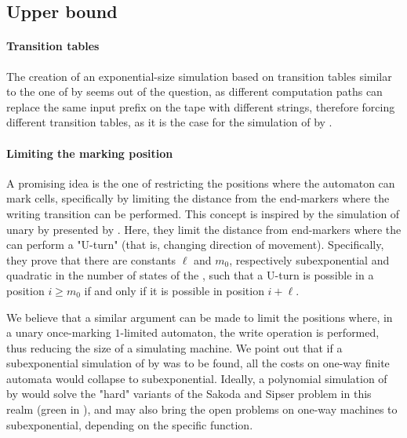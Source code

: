 \subsection{Upper bound}

\paragraph{Transition tables} The creation of an exponential-size simulation based on transition tables similar to the one of \TNFA by \ODFA seems out of the question, as different computation paths can replace the same input prefix on the tape with different strings, therefore forcing different transition tables, as it is the case for the simulation of \OLA by \ODFA.

\paragraph{Limiting the marking position} A promising idea is the one of restricting the positions where the automaton can mark cells, specifically by limiting the distance from the end-markers where the writing transition can be performed.
This concept is inspired by the simulation of unary \TNFA by \ODFA presented by .
Here, they limit the distance from end-markers where the \TNFA can perform a "U-turn" (that is, changing direction of movement).
Specifically, they prove that there are constants $\ell$ and $m_0$, respectively subexponential and quadratic in the number of states of the \TNFA, such that a U-turn is possible in a position $i\ge m_0$ if and only if it is possible in position $i+\ell$.

We believe that a similar argument can be made to limit the positions where, in a unary once-marking $1$-limited automaton, the write operation is performed, thus reducing the size of a simulating machine.
We point out that if a subexponential simulation of \OMOLA by \ODFA was to be found, all the costs on one-way finite automata would collapse to subexponential.
Ideally, a polynomial simulation of \OMOLA by \TDFA would solve the "hard" variants of the Sakoda and Sipser problem in this realm (green in ), and may also bring the open problems on one-way machines to subexponential, depending on the specific function.
